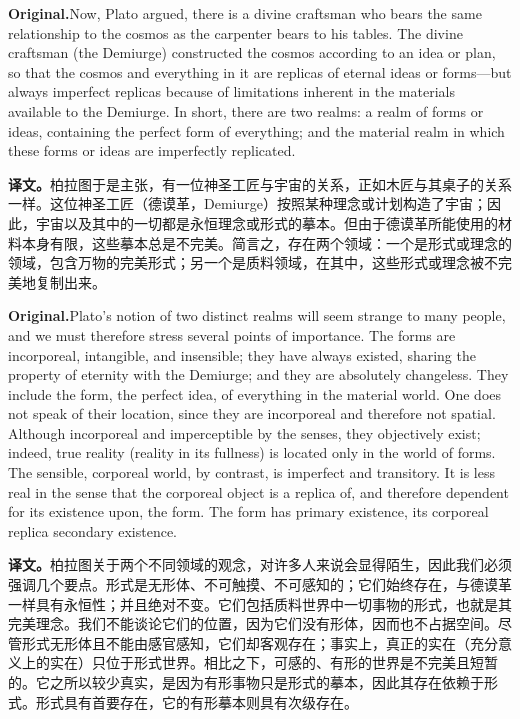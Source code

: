 \documentclass[UTF8]{ctexart}
\newcommand{\orig}{\par\noindent\textbf{Original.}\quad}
\newcommand{\zh}{\par\noindent\textbf{译文。}\quad}
\begin{document}
\orig Now, Plato argued, there is a divine craftsman who bears the same relationship to the cosmos as the carpenter bears to his tables. The divine craftsman (the Demiurge) constructed the cosmos according to an idea or plan, so that the cosmos and everything in it are replicas of eternal ideas or forms---but always imperfect replicas because of limitations inherent in the materials available to the Demiurge. In short, there are two realms: a realm of forms or ideas, containing the perfect form of everything; and the material realm in which these forms or ideas are imperfectly replicated.

\zh 柏拉图于是主张，有一位神圣工匠与宇宙的关系，正如木匠与其桌子的关系一样。这位神圣工匠（德谟革，Demiurge）按照某种理念或计划构造了宇宙；因此，宇宙以及其中的一切都是永恒理念或形式的摹本。但由于德谟革所能使用的材料本身有限，这些摹本总是不完美。简言之，存在两个领域：一个是形式或理念的领域，包含万物的完美形式；另一个是质料领域，在其中，这些形式或理念被不完美地复制出来。

\orig Plato's notion of two distinct realms will seem strange to many people, and we must therefore stress several points of importance. The forms are incorporeal, intangible, and insensible; they have always existed, sharing the property of eternity with the Demiurge; and they are absolutely changeless. They include the form, the perfect idea, of everything in the material world. One does not speak of their location, since they are incorporeal and therefore not spatial. Although incorporeal and imperceptible by the senses, they objectively exist; indeed, true reality (reality in its fullness) is located only in the world of forms. The sensible, corporeal world, by contrast, is imperfect and transitory. It is less real in the sense that the corporeal object is a replica of, and therefore dependent for its existence upon, the form. The form has primary existence, its corporeal replica secondary existence.

\zh 柏拉图关于两个不同领域的观念，对许多人来说会显得陌生，因此我们必须强调几个要点。形式是无形体、不可触摸、不可感知的；它们始终存在，与德谟革一样具有永恒性；并且绝对不变。它们包括质料世界中一切事物的形式，也就是其完美理念。我们不能谈论它们的位置，因为它们没有形体，因而也不占据空间。尽管形式无形体且不能由感官感知，它们却客观存在；事实上，真正的实在（充分意义上的实在）只位于形式世界。相比之下，可感的、有形的世界是不完美且短暂的。它之所以较少真实，是因为有形事物只是形式的摹本，因此其存在依赖于形式。形式具有首要存在，它的有形摹本则具有次级存在。
\end{document}
